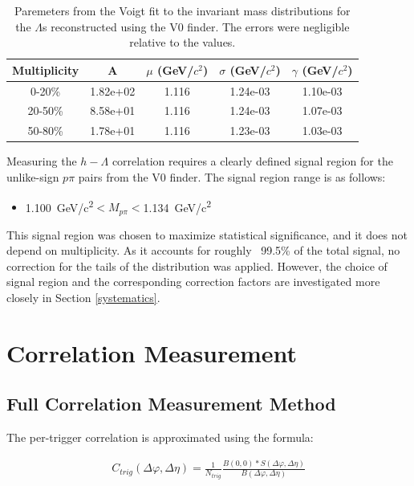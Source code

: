 \documentclass[ALICE,manyauthors]{ALICE_analysis_notes}
\begin{document}
\begin{table}[h!]
    \centering
\begin{tabular}{| c | c | c | c | c | }
\hline
Multiplicity & A & $\mu$ (GeV/$c^2$) & $\sigma$ (GeV/$c^2$) & $\gamma$ (GeV/$c^2$) \\
\hline
0-20\% & 1.82e+02  & 1.116 & 1.24e-03 & 1.10e-03\\
20-50\% & 8.58e+01 & 1.116 & 1.24e-03 & 1.07e-03\\
50-80\% & 1.78e+01 & 1.116 & 1.23e-03 & 1.03e-03\\
\hline
\end{tabular}
\caption{Paremeters from the Voigt fit to the invariant mass distributions for the $\Lambda$s reconstructed using the V0 finder. The errors were negligible relative to the values.}
\label{voigt_parameters}
\end{table}

 Measuring the $h-\Lambda$ correlation requires a clearly defined signal region for the unlike-sign $p\pi$ pairs from the V0 finder. The signal region range is as follows:

\begin{itemize}
	\item {}  \SI{1.100}{GeV/c^2}$< M_{p\pi} < $\SI{1.134}{GeV/c^2}
\end{itemize}

This signal region was chosen to maximize statistical significance, and it does not depend on multiplicity. As it accounts for roughly ~99.5\% of the total signal, no correction for the tails of the distribution was applied. However, the choice of signal region and the corresponding correction factors are investigated more closely in Section \ref{systematics}.



\section{Correlation Measurement}
\label{corrsec}
\subsection{Full Correlation Measurement Method}

The per-trigger correlation is approximated using the formula:

\begin{align}
\label{corrEq}
C_{trig}(\Delta\varphi, \Delta\eta) = \frac{1}{N_{trig}}\frac{B(0,0)*S(\Delta\varphi,\Delta\eta)}{B(\Delta\varphi, \Delta\eta)}
\end{align}
\end{document}
